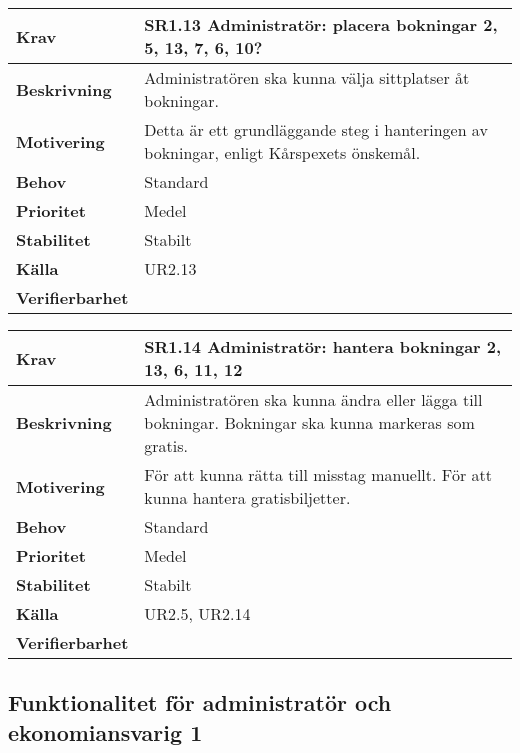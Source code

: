 \documentclass[a4paper, twoside, 11pt, titlepage]{article}
\begin{document}
	\begin{tabular} { p{2.6cm} p{12.5cm} }
		\hline
		\sffamily\textbf{Krav} & \sffamily\textbf{SR1.13 Administratör: placera bokningar 2, 5, 13, 7, 6, 10? } \\
		\hline
		\sffamily\textbf{Beskrivning} & Administratören ska kunna välja sittplatser åt bokningar.  \\
		\hline
		\sffamily\textbf{Motivering} & Detta är ett grundläggande steg i hanteringen av bokningar, enligt Kårspexets önskemål.  \\
		\hline
		\sffamily\textbf{Behov} & Standard  \\
		\hline
		\sffamily\textbf{Prioritet} & Medel  \\
		\hline
		\sffamily\textbf{Stabilitet} & Stabilt  \\
		\hline
		\sffamily\textbf{Källa} & UR2.13  \\
		\hline
		\sffamily\textbf{Verifierbarhet} &   \\
		\hline
	\end{tabular}
	\vspace{6mm}

	\begin{tabular} { p{2.6cm} p{12.5cm} }
		\hline
		\sffamily\textbf{Krav} & \sffamily\textbf{SR1.14 Administratör: hantera bokningar 2, 13, 6, 11, 12 } \\
		\hline
		\sffamily\textbf{Beskrivning} & Administratören ska kunna ändra eller lägga till bokningar. Bokningar ska kunna markeras som gratis.  \\
		\hline
		\sffamily\textbf{Motivering} & För att kunna rätta till misstag manuellt. För att kunna hantera gratisbiljetter.  \\
		\hline
		\sffamily\textbf{Behov} & Standard  \\
		\hline
		\sffamily\textbf{Prioritet} & Medel  \\
		\hline
		\sffamily\textbf{Stabilitet} & Stabilt  \\
		\hline
		\sffamily\textbf{Källa} & UR2.5, UR2.14  \\
		\hline
		\sffamily\textbf{Verifierbarhet} &   \\
		\hline
	\end{tabular}


	\subsection{Funktionalitet för administratör och ekonomiansvarig 1}
\end{document}
